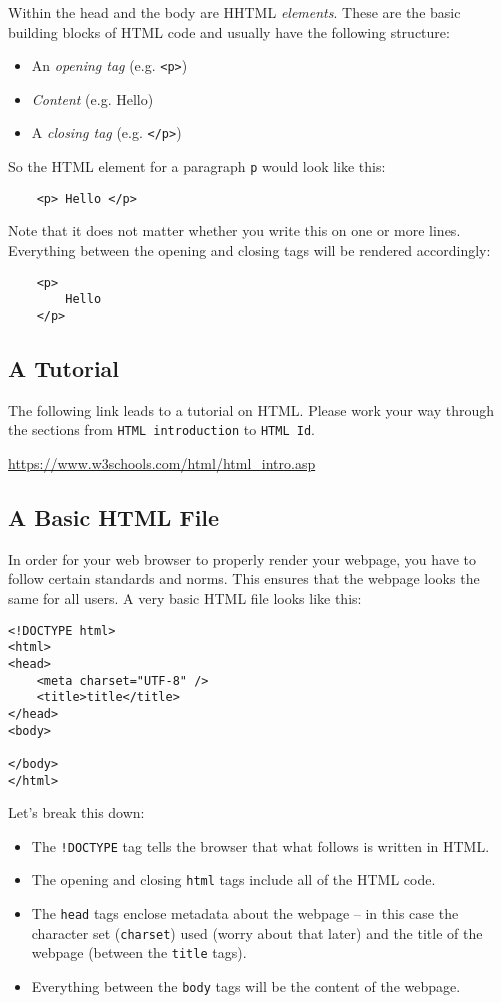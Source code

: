 \documentclass[english,11pt,a4paper]{report}
\begin{document}
Within the head and the body are HHTML \emph{elements}. These are the basic building blocks of HTML code and usually have the following structure: 
\begin{itemize}
    \item An \emph{opening tag} (e.g. \lstinline|<p>|)
    \item \emph{Content} (e.g. Hello)
    \item A \emph{closing tag} (e.g. \lstinline|</p>|)
\end{itemize}

So the HTML element for a paragraph \lstinline|p| would look like this:
\begin{lstlisting}
    <p> Hello </p>
\end{lstlisting}
Note that it does not matter whether you write this on one or more lines. Everything between the opening and closing tags will be rendered accordingly:
\begin{lstlisting}
    <p> 
        Hello 
    </p>
\end{lstlisting}

\subsection{A Tutorial}
The following link leads to a tutorial on HTML. Please work your way through the sections from \verb|HTML introduction| to \verb|HTML Id|.

\url{https://www.w3schools.com/html/html_intro.asp} 

\newpage
\subsection{A Basic HTML File}
In order for your web browser to properly render your webpage, you have to follow certain standards and norms. This ensures that the webpage looks the same for all users. A very basic HTML file looks like this:

\begin{lstlisting}
<!DOCTYPE html>
<html>
<head>
    <meta charset="UTF-8" />
    <title>title</title>
</head>
<body>
    
</body>
</html>
\end{lstlisting}

Let's break this down:
\begin{itemize}
    \item The \lstinline|!DOCTYPE| tag tells the browser that what follows is written in HTML.
    \item The opening and closing \lstinline|html| tags include all of the HTML code.
    \item The \lstinline|head| tags enclose metadata about the webpage -- in this case the character set (\lstinline|charset|) used (worry about that later) and the title of the webpage (between the \lstinline|title| tags).
    \item Everything between the \lstinline|body| tags will be the content of the webpage.
\end{itemize}
\end{document}
